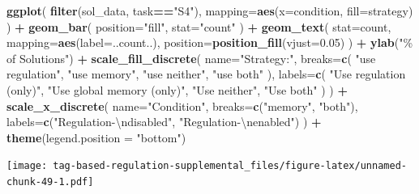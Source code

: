 \documentclass[
]{book}
\newenvironment{Shaded}{\begin{snugshade}}{\end{snugshade}}
\newcommand{\CharTok}[1]{\textcolor[rgb]{0.31,0.60,0.02}{#1}}
\newcommand{\DataTypeTok}[1]{\textcolor[rgb]{0.13,0.29,0.53}{#1}}
\newcommand{\FloatTok}[1]{\textcolor[rgb]{0.00,0.00,0.81}{#1}}
\newcommand{\KeywordTok}[1]{\textcolor[rgb]{0.13,0.29,0.53}{\textbf{#1}}}
\newcommand{\NormalTok}[1]{#1}
\newcommand{\OperatorTok}[1]{\textcolor[rgb]{0.81,0.36,0.00}{\textbf{#1}}}
\newcommand{\StringTok}[1]{\textcolor[rgb]{0.31,0.60,0.02}{#1}}
\begin{document}
\begin{Shaded}
\begin{Highlighting}[]
\KeywordTok{ggplot}\NormalTok{( }\KeywordTok{filter}\NormalTok{(sol\_data, task}\OperatorTok{==}\StringTok{"S4"}\NormalTok{), }\DataTypeTok{mapping=}\KeywordTok{aes}\NormalTok{(}\DataTypeTok{x=}\NormalTok{condition, }\DataTypeTok{fill=}\NormalTok{strategy) ) }\OperatorTok{+}
\StringTok{  }\KeywordTok{geom\_bar}\NormalTok{(}
    \DataTypeTok{position=}\StringTok{"fill"}\NormalTok{,}
    \DataTypeTok{stat=}\StringTok{"count"}
\NormalTok{  ) }\OperatorTok{+}
\StringTok{  }\KeywordTok{geom\_text}\NormalTok{(}
    \DataTypeTok{stat=}\StringTok{\textquotesingle{}count\textquotesingle{}}\NormalTok{,}
    \DataTypeTok{mapping=}\KeywordTok{aes}\NormalTok{(}\DataTypeTok{label=}\NormalTok{..count..),}
    \DataTypeTok{position=}\KeywordTok{position\_fill}\NormalTok{(}\DataTypeTok{vjust=}\FloatTok{0.05}\NormalTok{)}
\NormalTok{  ) }\OperatorTok{+}
\StringTok{  }\KeywordTok{ylab}\NormalTok{(}\StringTok{"\% of Solutions"}\NormalTok{) }\OperatorTok{+}
\StringTok{  }\KeywordTok{scale\_fill\_discrete}\NormalTok{(}
    \DataTypeTok{name=}\StringTok{"Strategy:"}\NormalTok{,}
    \DataTypeTok{breaks=}\KeywordTok{c}\NormalTok{(}
      \StringTok{"use regulation"}\NormalTok{,}
      \StringTok{"use memory"}\NormalTok{,}
      \StringTok{"use neither"}\NormalTok{,}
      \StringTok{"use both"}
\NormalTok{    ),}
    \DataTypeTok{labels=}\KeywordTok{c}\NormalTok{(}
      \StringTok{"Use regulation (only)"}\NormalTok{,}
      \StringTok{"Use global memory (only)"}\NormalTok{,}
      \StringTok{"Use neither"}\NormalTok{,}
      \StringTok{"Use both"}
\NormalTok{    )}
\NormalTok{  ) }\OperatorTok{+}
\StringTok{  }\KeywordTok{scale\_x\_discrete}\NormalTok{(}
    \DataTypeTok{name=}\StringTok{"Condition"}\NormalTok{,}
    \DataTypeTok{breaks=}\KeywordTok{c}\NormalTok{(}\StringTok{"memory"}\NormalTok{, }\StringTok{"both"}\NormalTok{),}
    \DataTypeTok{labels=}\KeywordTok{c}\NormalTok{(}\StringTok{"Regulation{-}}\CharTok{\textbackslash{}n}\StringTok{disabled"}\NormalTok{, }\StringTok{"Regulation{-}}\CharTok{\textbackslash{}n}\StringTok{enabled"}\NormalTok{)}
\NormalTok{  ) }\OperatorTok{+}
\StringTok{  }\KeywordTok{theme}\NormalTok{(}\DataTypeTok{legend.position =} \StringTok{"bottom"}\NormalTok{)}
\end{Highlighting}
\end{Shaded}

\texttt{[image: tag-based-regulation-supplemental\_files/figure-latex/unnamed-chunk-49-1.pdf]}
\end{document}
